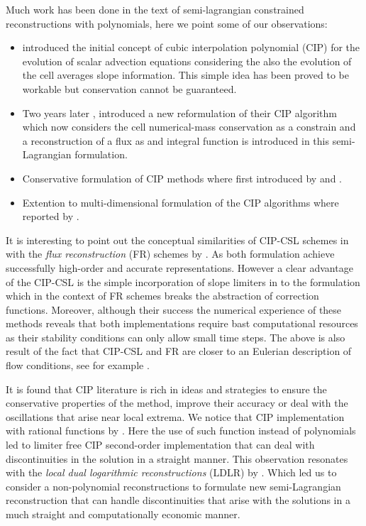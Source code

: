 \documentclass[10pt,a4paper]{article}
\begin{document}
Much work has been done in the text of semi-lagrangian constrained reconstructions with polynomials, here we point some of our observations:
\begin{itemize}
	\item \cite{Yabe1991} introduced the initial concept of cubic interpolation polynomial (CIP) for the evolution of scalar advection equations considering the also the evolution of the cell averages slope information. This simple idea has been proved to be workable but conservation cannot be guaranteed.
	\item Two years later \cite{Yabe2001}, introduced a new reformulation of their CIP algorithm which now considers the cell numerical-mass conservation as a constrain and a reconstruction of a flux as and integral function is introduced in this semi-Lagrangian formulation.
	\item Conservative formulation of CIP methods where first introduced by \cite{Tanaka2000} and \cite{Xiao2001}.
	\item Extention to multi-dimensional formulation of the CIP algorithms where reported by \cite{Nakamura2001}.
\end{itemize}

It is interesting to point out the conceptual similarities of CIP-CSL schemes in \cite{LiXiao2007} with the \emph{flux reconstruction} (FR) schemes by \cite{Huynh2007}. As both formulation achieve successfully high-order and accurate representations. However a clear advantage of the CIP-CSL is the simple incorporation of slope limiters in to the formulation which in the context of FR schemes breaks the abstraction of correction functions. Moreover, although their success the numerical experience of these methods reveals that both implementations require bast computational resources as their stability conditions can only allow small time steps. 
The above is also result of the fact that CIP-CSL and FR are closer to an Eulerian description of flow conditions, see for example \cite{LiXiao2009}.

It is found that CIP literature is rich in ideas and strategies to ensure the conservative properties of the method, improve their accuracy or deal with the oscillations that arise near local extrema. We notice that CIP implementation with rational functions by \cite{Xiao1996}. Here the use of such function instead of polynomials led to limiter free CIP second-order implementation that can deal with discontinuities in the solution in a straight manner. This observation resonates with the \emph{local dual logarithmic reconstructions} (LDLR) by \cite{Artebrant2006}. Which led us to consider a non-polynomial reconstructions to formulate new semi-Lagrangian reconstruction that can handle discontinuities that arise with the solutions in a much straight and computationally economic manner.
\end{document}
